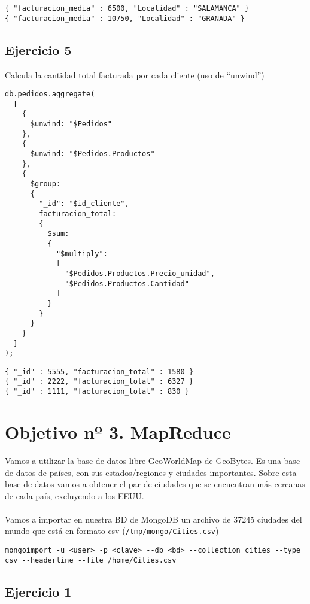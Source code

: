 \begin{lstlisting}
{ "facturacion_media" : 6500, "Localidad" : "SALAMANCA" }
{ "facturacion_media" : 10750, "Localidad" : "GRANADA" }
\end{lstlisting}

\subsection{Ejercicio 5}

Calcula la cantidad total facturada por cada cliente (uso de ``unwind'')

\begin{lstlisting}
db.pedidos.aggregate(
  [
    {
      $unwind: "$Pedidos"
    },
    {
      $unwind: "$Pedidos.Productos"
    },
    {
      $group: 
      {
        "_id": "$id_cliente", 
        facturacion_total: 
        {
          $sum: 
          {
            "$multiply": 
            [
              "$Pedidos.Productos.Precio_unidad",
              "$Pedidos.Productos.Cantidad"
            ]
          }
        }
      }
    }  
  ]  
);
\end{lstlisting}

\begin{lstlisting}
{ "_id" : 5555, "facturacion_total" : 1580 }
{ "_id" : 2222, "facturacion_total" : 6327 }
{ "_id" : 1111, "facturacion_total" : 830 }
\end{lstlisting}

\section{Objetivo nº 3. MapReduce}

Vamos a utilizar la base de datos libre GeoWorldMap de GeoBytes. Es una base de datos de países, con sus estados/regiones y ciudades importantes. Sobre esta base de datos vamos a obtener el par de ciudades que se encuentran más cercanas de cada país, excluyendo a los EEUU.
\\ \\
Vamos a importar en nuestra BD de MongoDB un archivo de 37245 ciudades del mundo que está en formato csv (\texttt{/tmp/mongo/Cities.csv})

\begin{lstlisting}
mongoimport -u <user> -p <clave> --db <bd> --collection cities --type csv --headerline --file /home/Cities.csv
\end{lstlisting}

\subsection{Ejercicio 1}

